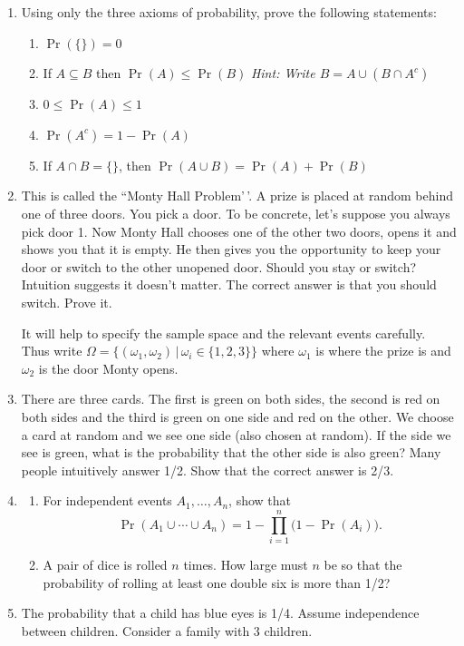 \documentclass[
]{book}
\providecommand{\tightlist}{%
  \setlength{\itemsep}{0pt}\setlength{\parskip}{0pt}}
\theoremstyle{definition}
\theoremstyle{definition}
\theoremstyle{definition}
\theoremstyle{definition}
\theoremstyle{remark}
\begin{document}
\begin{enumerate}
\def\labelenumi{\arabic{enumi}.}
\item
  Using only the three axioms of probability, prove the following statements:

  \begin{enumerate}
  \def\labelenumii{(\alph{enumii})}
  \tightlist
  \item
    \(\Pr(\{\})=0\)
  \item
    If \(A \subseteq B\) then \(\Pr(A) \leq \Pr(B)\) \emph{Hint: Write \(B = A \cup (B \cap A^c)\)}
  \item
    \(0 \leq \Pr(A) \leq 1\)
  \item
    \(\Pr(A^c)=1-\Pr(A)\)
  \item
    If \(A \cap B = \{\}\), then \(\Pr(A\cup B) = \Pr(A) + \Pr(B)\)
  \end{enumerate}
\item
  This is called the ``Monty Hall Problem'\,'. A prize is placed at random behind one of three doors. You pick a door. To be concrete, let's suppose you always pick door 1. Now Monty Hall chooses one of the other two doors, opens it and shows you that it is empty. He then gives you the opportunity to keep your door or switch to the other unopened door. Should you stay or switch? Intuition suggests it doesn't matter. The correct answer is that you should switch. Prove it.

  It will help to specify the sample space and the relevant events carefully. Thus write \(\Omega = \big\{(\omega_1,\omega_2) \,|\, \omega_i \in \{1,2,3\}\big\}\) where \(\omega_1\) is where the prize is and \(\omega_2\) is the door Monty opens.
\item
  There are three cards. The first is green on both sides, the second is red on both sides and the third is green on one side and red on the other. We choose a card at random and we see one side (also chosen at random). If the side we see is green, what is the probability that the other side is also green? Many people intuitively answer 1/2. Show that the correct answer is 2/3.
\item
  \begin{enumerate}
  \def\labelenumii{(\alph{enumii})}
  \item
    For independent events \(A_1,\dots,A_n\), show that
    \[\Pr(A_1 \cup \cdots \cup A_n) = 1 - \prod_{i=1}^n \big(1 - \Pr(A_i)\big).\]
  \item
    A pair of dice is rolled \(n\) times. How large must \(n\) be so that the probability of rolling at least one double six is more than 1/2?
  \end{enumerate}
\item
  The probability that a child has blue eyes is 1/4. Assume independence between children. Consider a family with 3 children.


\end{enumerate}
\end{document}
